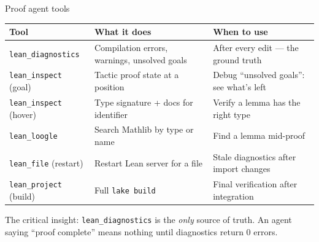 \documentclass[aspectratio=169,10pt]{beamer}
\begin{document}
\begin{frame}{Proof agent tools}
    \vspace{-0.4em}
    \begin{center}
    \renewcommand{\arraystretch}{1.2}
    {\footnotesize
    \begin{tabular}{@{}l p{4.5cm} p{5.5cm}@{}}
        \toprule
        \textbf{Tool} & \textbf{What it does} & \textbf{When to use} \\
        \midrule
        \texttt{lean\_diagnostics} & Compilation errors, warnings, unsolved goals & After every edit --- the ground truth \\
        \texttt{lean\_inspect} (goal) & Tactic proof state at a position & Debug ``unsolved goals'': see what's left \\
        \texttt{lean\_inspect} (hover) & Type signature + docs for identifier & Verify a lemma has the right type \\
        \texttt{lean\_loogle} & Search Mathlib by type or name & Find a lemma mid-proof \\
        \texttt{lean\_file} (restart) & Restart Lean server for a file & Stale diagnostics after import changes \\
        \texttt{lean\_project} (build) & Full \texttt{lake build} & Final verification after integration \\
        \bottomrule
    \end{tabular}
    }
    \end{center}
    \vspace{0.3em}
    \textcolor{dimwhite}{\footnotesize The critical insight: \texttt{lean\_diagnostics} is the \emph{only} source of truth. An agent saying ``proof complete'' means nothing until diagnostics return 0 errors.}
\end{frame}
\end{document}
